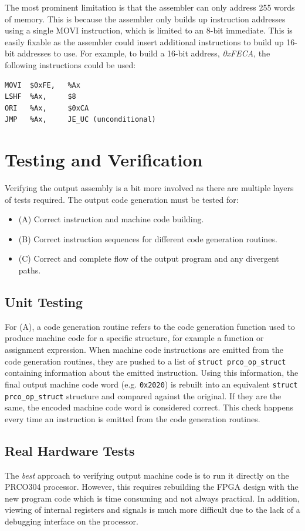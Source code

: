 \documentclass[11pt,a4paper]{report}
\newcommand{\scname}{PRCO304}
\begin{document}
The most prominent limitation is that the assembler can only address 255 words of memory. This is because the assembler only builds up instruction addresses using a single MOVI instruction, which is limited to an 8-bit immediate. This is easily fixable as the assembler could insert additional instructions to build up 16-bit addresses to use. For example, to build a 16-bit address, \textit{0xFECA}, the following instructions could be used:
\begin{verbatim}
MOVI  $0xFE,   %Ax
LSHF  %Ax,     $8
ORI   %Ax,     $0xCA
JMP   %Ax,     JE_UC (unconditional)
\end{verbatim}

\section{Testing and Verification}
Verifying the output assembly is a bit more involved as there are multiple layers of tests required. The output code generation must be tested for:
\begin{itemize}
\item{(A) Correct instruction and machine code building.}
\item{(B) Correct instruction sequences for different code generation routines.}
\item{(C) Correct and complete flow of the output program and any divergent paths.}
\end{itemize}

\subsection*{Unit Testing}
For (A), a code generation routine refers to the code generation function used to produce machine code for a specific structure, for example a function or assignment expression. When machine code instructions are emitted from the code generation routines, they are pushed to a list of \texttt{struct prco_op_struct} containing information about the emitted instruction. Using this information, the final output machine code word (e.g. \texttt{0x2020}) is rebuilt into an equivalent \texttt{struct prco_op_struct} structure and compared against the original. If they are the same, the encoded machine code word is considered correct. This check happens every time an instruction is emitted from the code generation routines.

\subsection*{Real Hardware Tests}
The \textit{best} approach to verifying output machine code is to run it directly on the \scname{} processor. However, this requires rebuilding the FPGA design with the new program code which is time consuming and not always practical. In addition, viewing of internal registers and signals is much more difficult due to the lack of a debugging interface on the processor.
 
\end{document}
